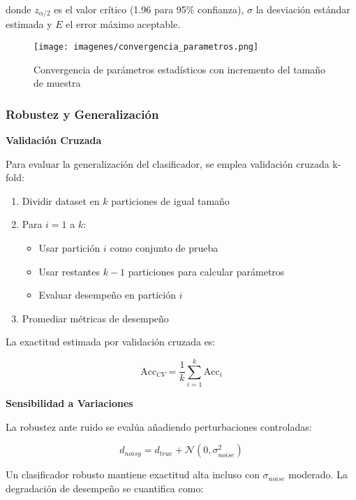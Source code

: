 donde $z_{\alpha/2}$ es el valor crítico (1.96 para 95\% confianza), $\sigma$ la desviación estándar estimada y $E$ el error máximo aceptable.

\begin{figure}[h]
\centering
\texttt{[image: imagenes/convergencia\_parametros.png]}
\caption{Convergencia de parámetros estadísticos con incremento del tamaño de muestra}
\label{fig:convergencia}
\end{figure}

\subsubsection{Robustez y Generalización}

\textbf{Validación Cruzada}

Para evaluar la generalización del clasificador, se emplea validación cruzada k-fold:

\begin{enumerate}
\item Dividir dataset en $k$ particiones de igual tamaño
\item Para $i = 1$ a $k$:
   \begin{itemize}
   \item Usar partición $i$ como conjunto de prueba
   \item Usar restantes $k-1$ particiones para calcular parámetros
   \item Evaluar desempeño en partición $i$
   \end{itemize}
\item Promediar métricas de desempeño
\end{enumerate}

La exactitud estimada por validación cruzada es:

\begin{equation}
\text{Acc}_{CV} = \frac{1}{k}\sum_{i=1}^{k} \text{Acc}_i
\end{equation}

\textbf{Sensibilidad a Variaciones}

La robustez ante ruido se evalúa añadiendo perturbaciones controladas:

\begin{equation}
d_{noisy} = d_{true} + \mathcal{N}(0, \sigma_{noise}^2)
\end{equation}

Un clasificador robusto mantiene exactitud alta incluso con $\sigma_{noise}$ moderado. La degradación de desempeño se cuantifica como:

